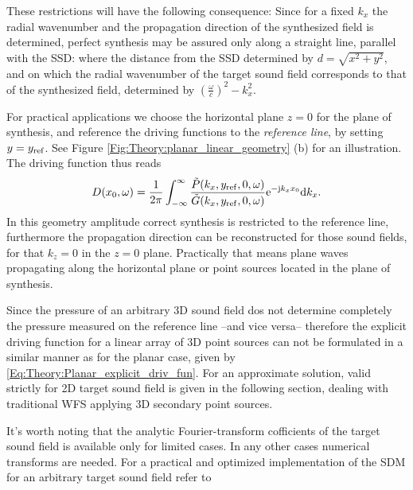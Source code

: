 These restrictions will have the following consequence:
Since for a fixed $k_x$ the radial wavenumber and the propagation direction of the synthesized field is determined, perfect synthesis may be assured only along a straight line, parallel with the SSD: where the distance from the SSD determined by $d = \sqrt{x^2 + y^2}$, and on which the radial wavenumber of the target sound field corresponds to that of the synthesized field, determined by $\left( \frac{\omega} {c}\right)^2 - k_x^2$.

For practical applications we choose the horizontal plane $z=0$ for the plane of synthesis, and reference the driving functions to the \emph{reference line}, by setting $y = y_{\mathrm{ref}}$.
See Figure \ref{Fig:Theory:planar_linear_geometry} (b) for an illustration. The driving function thus reads
\begin{equation}
D(x_0,\omega) = \frac{1}{2\pi} \int_{-\infty}^{\infty} \frac{\tilde{P}(k_x,y_{\mathrm{ref}},0, \omega) }{\tilde{G}(k_x,y_{\mathrm{ref}},0, \omega)} \mathrm{e}^{-\mathrm{j} k_x x_0} \mathrm{d} k_x.
\label{Eq:Theory:Linear_SDM}
\end{equation}
In this geometry amplitude correct synthesis is restricted to the reference line, furthermore the propagation direction can be reconstructed for those sound fields, for that $k_z = 0$ in the $z=0$ plane. Practically that means plane waves propagating along the horizontal plane or point sources located in the plane of synthesis.

Since the pressure of an arbitrary 3D sound field dos not determine completely the pressure measured on the reference line --and vice versa-- therefore the explicit driving function for a linear array of 3D point sources can not be formulated in a similar manner as for the planar case, given by \eqref{Eq:Theory:Planar_explicit_driv_fun}. For an approximate solution, valid strictly for 2D target sound field is given in the following section, dealing with traditional WFS applying 3D secondary point sources.

\vspace{3mm}
It's worth noting that the analytic Fourier-transform cofficients of the target sound field is available only for limited cases. In any other cases numerical transforms are needed.
For a practical and optimized implementation of the SDM for an arbitrary target sound field refer to \cite{ahrens2013a:efficientSDM}

%


